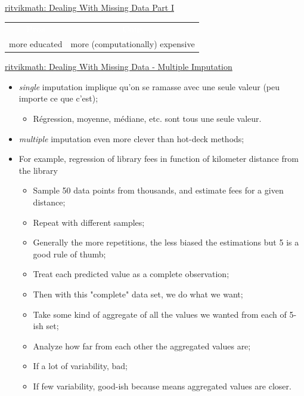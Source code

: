 \documentclass[12pt, titlepage, french]{report}
\begin{document}
\begin{YTB_SUMM_AUTO_NUMB}[label = {rvm-MCAR-etal-deal}]{\href{https://www.youtube.com/watch?v=qIXHLZJJ42U}{ritvikmath: Dealing With Missing Data Part I}}
\begin{itemize}[leftmargin = *]
\begin{center}
\begin{tabular}{| >{\columncolor{beaublue}}c | >{\columncolor{beaublue}}c |}
	\hline\rowcolor{airforceblue} 
		\textcolor{white}{\textbf{Pros}}	&	\textcolor{white}{\textbf{Cons}}	\\
more educated	&	more (computationally) expensive	\\\hline
	\end{tabular}
	\end{center}
\end{itemize}
\end{YTB_SUMM_AUTO_NUMB}

\begin{YTB_SUMM_AUTO_NUMB}[label = {rvm-MCAR-etal-mult}]{\href{https://www.youtube.com/watch?v=LMsULWGtP2c}{ritvikmath: Dealing With Missing Data - Multiple Imputation}}
\begin{itemize}[leftmargin = *]
	\item	\textit{single} imputation implique qu'on se ramasse avec une seule valeur (peu importe ce que c'est);
		\begin{itemize}
		\item	Régression, moyenne, médiane, etc. sont tous une seule valeur.
		\end{itemize}
	\item	\textit{multiple} imputation even more clever than hot-deck methods;
	\item	For example, regression of library fees in function of kilometer distance from the library
		\begin{itemize}[leftmargin = *]
		\item	Sample 50 data points from thousands, and estimate fees for a given distance;
		\item	Repeat with different samples;
		\item[]	Generally the more repetitions, the less biased the estimations but 5 is a good rule of thumb;
		\item	Treat each predicted value as a complete observation;
		\item	Then with this "complete" data set, we do what we want;
		\item	Take some kind of aggregate of all the values we wanted from each of 5-ish set;
		\item	Analyze how far from each other the aggregated values are;
		\item[]	If a lot of variability, bad;
		\item[]	If few variability, good-ish because means aggregated values are closer.	
		\end{itemize}
		\begin{center}

\end{center}
\end{itemize}
\end{YTB_SUMM_AUTO_NUMB}
\end{document}

